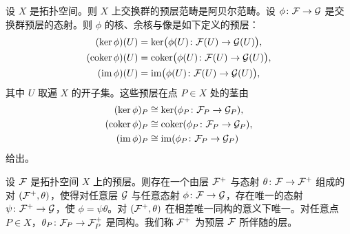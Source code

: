 \begin{proposition}\label{it:1.1.4}
设 $X$ 是拓扑空间。则 $X$ 上交换群的预层范畴是阿贝尔范畴。设 $\phi\colon\mathcal{F}\to\mathcal{G}$ 是交换群预层的态射。则 $\phi$ 的核、余核与像是如下定义的预层：
\[
\begin{aligned}
(\ker\phi)(U)&=\ker\bigl(\phi(U)\colon\mathcal{F}(U)\to\mathcal{G}(U)\bigr),\\
(\operatorname{coker}\phi)(U)&=\operatorname{coker}\bigl(\phi(U)\colon\mathcal{F}(U)\to\mathcal{G}(U)\bigr),\\
(\operatorname{im}\phi)(U)&=\operatorname{im}\bigl(\phi(U)\colon\mathcal{F}(U)\to\mathcal{G}(U)\bigr),
\end{aligned}
\]
其中 $U$ 取遍 $X$ 的开子集。这些预层在点 $P\in X$ 处的茎由
\[
\begin{aligned}
(\ker\phi)_P&\cong\ker(\phi_P\colon\mathcal{F}_P\to\mathcal{G}_P),\\
(\operatorname{coker}\phi)_P&\cong\operatorname{coker}(\phi_P\colon\mathcal{F}_P\to\mathcal{G}_P),\\
(\operatorname{im}\phi)_P&\cong\operatorname{im}(\phi_P\colon\mathcal{F}_P\to\mathcal{G}_P)
\end{aligned}
\]
给出。
\end{proposition}

\begin{proposition}\label{it:1.1.5}
设 $\mathcal{F}$ 是拓扑空间 $X$ 上的预层。则存在一个由层 $\mathcal{F}^+$ 与态射 $\theta\colon\mathcal{F}\to\mathcal{F}^+$ 组成的对 $(\mathcal{F}^+,\theta)$，使得对任意层 $\mathcal{G}$ 与任意态射 $\phi\colon\mathcal{F}\to\mathcal{G}$，存在唯一的态射 $\psi\colon\mathcal{F}^+\to\mathcal{G}$，使 $\phi=\psi\theta$。对 $(\mathcal{F}^+,\theta)$ 在相差唯一同构的意义下唯一。对任意点 $P\in X$，$\theta_P\colon\mathcal{F}_P\to\mathcal{F}^+_P$ 是同构。我们称 $\mathcal{F}^+$ 为预层 $\mathcal{F}$ 所伴随的层。
\end{proposition}

